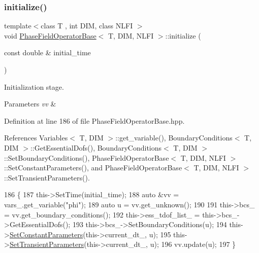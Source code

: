 \subsubsection{\texorpdfstring{initialize()}{initialize()}}
{\footnotesize\ttfamily template$<$class T , int D\+IM, class N\+L\+FI $>$ \\
void \hyperlink{classPhaseFieldOperatorBase}{Phase\+Field\+Operator\+Base}$<$ T, D\+IM, N\+L\+FI $>$\+::initialize (\begin{DoxyParamCaption}\item[{const double \&}]{initial\+\_\+time }\end{DoxyParamCaption})}



Initialization stage. 


\begin{DoxyParams}{Parameters}
{\em vv} & \\
\hline
\end{DoxyParams}


Definition at line 186 of file Phase\+Field\+Operator\+Base.\+hpp.



References Variables$<$ T, D\+I\+M $>$\+::get\+\_\+variable(), Boundary\+Conditions$<$ T, D\+I\+M $>$\+::\+Get\+Essential\+Dofs(), Boundary\+Conditions$<$ T, D\+I\+M $>$\+::\+Set\+Boundary\+Conditions(), Phase\+Field\+Operator\+Base$<$ T, D\+I\+M, N\+L\+F\+I $>$\+::\+Set\+Constant\+Parameters(), and Phase\+Field\+Operator\+Base$<$ T, D\+I\+M, N\+L\+F\+I $>$\+::\+Set\+Transient\+Parameters().


\begin{DoxyCode}
186                                                                                 \{
187   this->SetTime(initial\_time);
188   \textcolor{keyword}{auto} &vv = vars\_.get\_variable(\textcolor{stringliteral}{"phi"});
189   \textcolor{keyword}{auto} u = vv.get\_unknown();
190 
191   this->bcs\_ = vv.get\_boundary\_conditions();
192   this->ess\_tdof\_list\_ = this->bcs\_->GetEssentialDofs();
193   this->bcs\_->SetBoundaryConditions(u);
194   this->\hyperlink{classPhaseFieldOperatorBase_ae28add1cf3731d10726a9665862a725b}{SetConstantParameters}(this->current\_dt\_, u);
195   this->\hyperlink{classPhaseFieldOperatorBase_a07fb8bcd8791bb712681379c160c1ad6}{SetTransientParameters}(this->current\_dt\_, u);
196   vv.update(u);
197 \}
\end{DoxyCode}
\mbox{\label{classPhaseFieldOperatorBase_a55a314426a0d9bbb181cb5d35e8f76e9}} 
